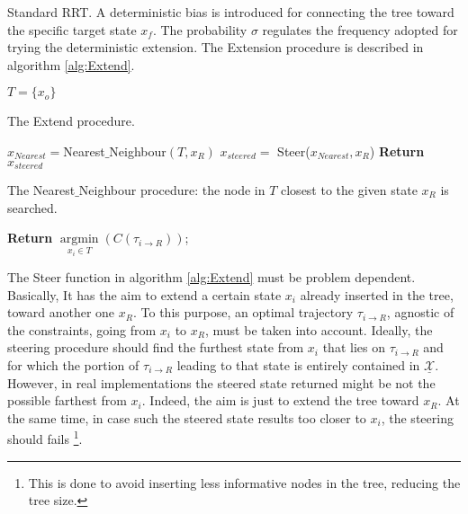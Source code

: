 \begin{algorithm}
 \caption{Standard RRT. A deterministic bias is introduced for connecting the tree toward the specific target state $x_f$.
 The probability $\sigma$ regulates the frequency adopted for trying the deterministic extension. The Extension procedure is described in algorithm \ref{alg:Extend}.
 \label{alg:RRT_single}}
 $T= \lbrace x_o \rbrace$\; 
 \end{algorithm}

\begin{algorithm}
 \caption{The Extend procedure. 
 \label{alg:Extend}}
 $x_{Nearest}=$Nearest$\_$Neighbour$(T, x_R)$\;
 $x_{steered}=$ Steer($x_{Nearest}, x_R$)\;
 \textbf{Return} $x_{steered}$\;
 \end{algorithm}

\begin{algorithm}
 \caption{The Nearest$\_$Neighbour procedure: the node in $T$ closest to the given state $x_R$ is searched.
\label{alg:NearNeigh}}
\textbf{Return} $\underset{x_i \in T}{\operatorname{argmin}}( C(\tau_{i \rightarrow R } ) )$;
\end{algorithm}

The Steer function in algorithm \ref{alg:Extend} must be problem dependent. Basically, It has the aim to extend a certain state $x_i$ already inserted in the tree, toward another one $x_R$. To this purpose, an optimal trajectory $\tau_{ i \rightarrow R}$, agnostic of the constraints, going from $x_i$ to $x_R$, must be taken into account. Ideally, the steering procedure should find the furthest state from $x_i$ that lies on  $\tau_{ i \rightarrow R}$ and for which the portion of $\tau_{ i \rightarrow R}$ leading to that state is entirely contained in 
$\underline{\mathcal{X}}$. However, in real implementations the steered state returned might be not the possible farthest from $x_i$. Indeed, the aim is just to extend the tree toward $x_R$. At the same time, in case such the steered state results too closer to $x_i$, the steering should fails \footnote{This is done to avoid inserting less informative nodes in the tree, reducing the tree size.}.

